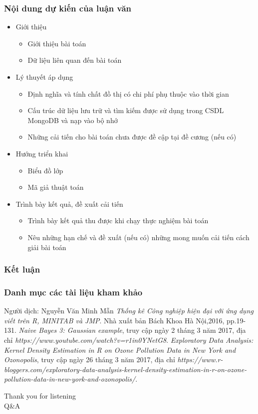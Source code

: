 \documentclass[t]{beamer}
\begin{document}
\begin{frame}
\frametitle{Nội dung dự kiến của luận văn}
\begin{itemize}
\item Giới thiệu
	\begin{itemize}
	\item Giới thiệu bài toán
	\item Dữ liệu liên quan đến bài toán
	\end{itemize}
\item Lý thuyết áp dụng
	\begin{itemize}
	\item Định nghĩa và tính chất đồ thị có chi phí phụ thuộc vào thời gian
	\item Cấu trúc dữ liệu lưu trữ và tìm kiếm được sử dụng trong CSDL MongoDB và nạp vào bộ nhớ
	\item Những cải tiến cho bài toán chưa được đề cập tại đề cương (nếu có)	
	\end{itemize}
\item Hướng triển khai
	\begin{itemize}
	\item Biểu đồ lớp
	\item Mã giả thuật toán
	\end{itemize}
\item Trình bày kết quả, đề xuất cải tiến
	\begin{itemize}
	\item Trình bày kết quả thu được khi chạy thực nghiệm bài toán
	\item Nêu những hạn chế và đề xuất (nếu có) những mong muốn cải tiến cách giải bài toán
	\end{itemize}
\end{itemize}
\end{frame}
\begin{frame}
\frametitle{Kết luận}
\end{frame}
\begin{frame}
\frametitle{Danh mục các tài liệu kham khảo}
\begin{thebibliography}{}
 Người dịch: Nguyễn Văn Minh Mẫn \emph{Thống kê Công nghiệp hiện đại với ứng dụng viết trên R, MINITAB và JMP}. Nhà xuất bản Bách Khoa Hà Nội,2016, pp.19-131.
	\emph{Naive Bayes 3: Gaussian example}, truy cập ngày 2 tháng 3 năm 2017,
	địa chỉ \emph{https://www.youtube.com/watch?v=r1in0YNetG8}.	
	\emph{Exploratory Data Analysis: Kernel Density Estimation in R on Ozone Pollution Data in New York and Ozonopolis}, truy cập ngày 26 tháng 3 năm 2017,
	địa chỉ \emph{https://www.r-bloggers.com/exploratory-data-analysis-kernel-density-estimation-in-r-on-ozone-pollution-data-in-new-york-and-ozonopolis/}.
\end{thebibliography}
\end{frame}

\begin{frame}[c]{ }
\begin{Huge}
\centering
Thank you for listening\\Q\&A\\
\end{Huge}
\end{frame}
\end{document}
